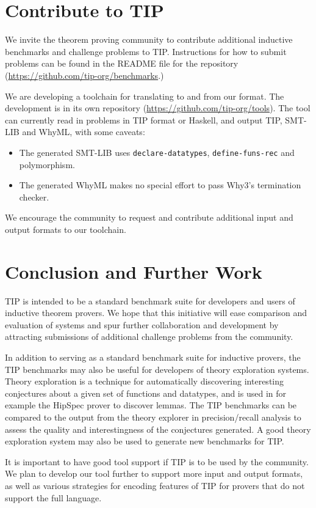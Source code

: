 \documentclass{llncs}
\begin{document}
\section{Contribute to TIP}
We invite the theorem proving community to contribute additional inductive
benchmarks and challenge problems to TIP. Instructions for how to submit
problems can be found in the README file for the repository
(\url{https://github.com/tip-org/benchmarks}.)

We are developing a toolchain for translating to and from our format. The
development is in its own repository
(\url{https://github.com/tip-org/tools}).
The tool can currently read in problems in TIP format or Haskell, and
output TIP, SMT-LIB and WhyML, with some caveats:
\begin{itemize}
  \item The generated SMT-LIB uses \verb|declare-datatypes|,
    \verb|define-funs-rec| and polymorphism.
  \item The generated WhyML makes no special effort to pass Why3's
    termination checker.
\end{itemize}
We encourage the community to request and contribute additional input
and output formats to our toolchain.

\section{Conclusion and Further Work}
TIP is intended to be a standard benchmark suite for developers and users of inductive theorem provers. We hope that this initiative will ease comparison and evaluation of systems and spur further collaboration and development by attracting submissions of additional challenge problems from the community.

In addition to serving as a standard benchmark suite for inductive provers, the TIP benchmarks may also be useful for developers of theory exploration systems. Theory exploration is a technique for automatically discovering interesting conjectures about a given set of functions and datatypes, and is used in for example the HipSpec prover to discover lemmas. The TIP benchmarks can be compared to the output from the theory explorer in precision/recall analysis to assess the quality and interestingness of the conjectures generated. A good theory exploration system may also be used to generate new benchmarks for TIP.

It is important to have good tool support if TIP is to be used by the
community. We plan to develop our tool further to support more input
and output formats, as well as various strategies for encoding
features of TIP for provers that do not support the full language.
\end{document}
